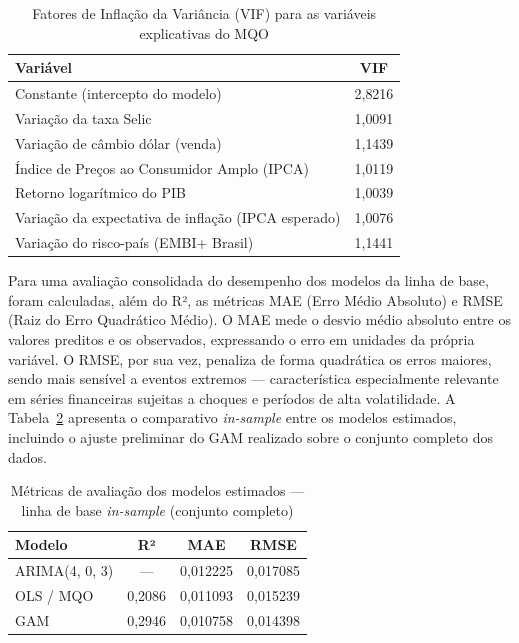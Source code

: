 \documentclass[	12pt, Times, openright, oneside, a4paper, english, brazil]{abntex2}
\begin{document}
\begin{table}[ht!]
\centering
\begin{tabular}{|l|c|}
\hline
\textbf{Variável} & \textbf{VIF} \\ \hline
Constante (intercepto do modelo) & 2{,}8216 \\ \hline
Variação da taxa Selic & 1{,}0091 \\ \hline
Variação de câmbio dólar (venda) & 1{,}1439 \\ \hline
Índice de Preços ao Consumidor Amplo (IPCA) & 1{,}0119 \\ \hline
Retorno logarítmico do PIB  & 1{,}0039 \\ \hline
Variação da expectativa de inflação (IPCA esperado) & 1{,}0076 \\ \hline
Variação do risco-país (EMBI+ Brasil) & 1{,}1441 \\ \hline
\end{tabular}
\caption{Fatores de Inflação da Variância (VIF) para as variáveis explicativas do MQO}\label{tab:vif}
\end{table}

Para uma avaliação consolidada do desempenho dos modelos da linha de base, foram calculadas, além do R², as métricas MAE (Erro Médio Absoluto) e RMSE (Raiz do Erro Quadrático Médio). O MAE mede o desvio médio absoluto entre os valores preditos e os observados, expressando o erro em unidades da própria variável. O RMSE, por sua vez, penaliza de forma quadrática os erros maiores, sendo mais sensível a eventos extremos — característica especialmente relevante em séries financeiras sujeitas a choques e períodos de alta volatilidade. A Tabela~\ref{tab:metricas} apresenta o comparativo \textit{in-sample} entre os modelos estimados, incluindo o ajuste preliminar do GAM realizado sobre o conjunto completo dos dados.

\begin{table}[ht!]
\centering
\begin{tabular}{|l|c|c|c|}
\hline
\textbf{Modelo} & \textbf{R²} & \textbf{MAE} & \textbf{RMSE} \\ \hline
ARIMA(4, 0, 3) & --- & 0{,}012225 & 0{,}017085 \\ \hline
OLS / MQO & 0{,}2086 & 0{,}011093 & 0{,}015239 \\ \hline
GAM & 0{,}2946 & 0{,}010758 & 0{,}014398 \\ \hline
\end{tabular}
\caption{Métricas de avaliação dos modelos estimados — linha de base \textit{in-sample} (conjunto completo)}\label{tab:metricas}
\end{table}
\end{document}
